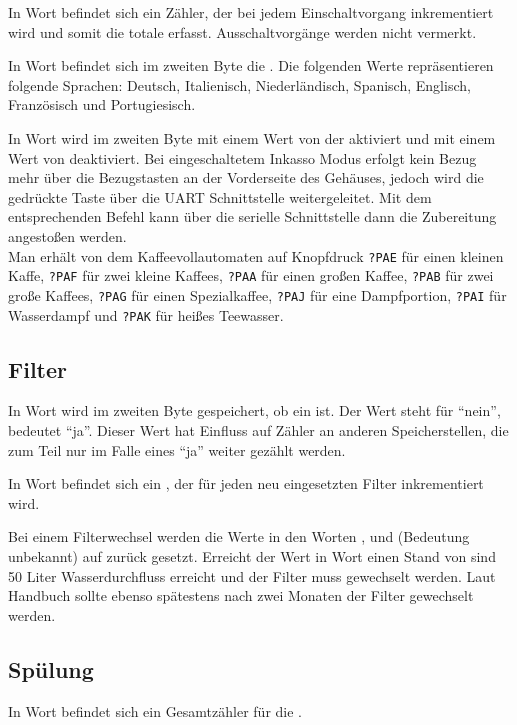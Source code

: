 In Wort  befindet sich ein Zähler, der bei jedem Einschaltvorgang inkrementiert wird und somit die totale  erfasst.
Ausschaltvorgänge werden nicht vermerkt.

In Wort  befindet sich im zweiten Byte die .
Die folgenden Werte repräsentieren folgende Sprachen:
 Deutsch,
 Italienisch,
 Niederländisch, 
 Spanisch,
 Englisch,
 Französisch und
 Portugiesisch.

In Wort  wird im zweiten Byte mit einem Wert von  der  aktiviert und mit einem Wert von  deaktiviert.
Bei eingeschaltetem Inkasso Modus erfolgt kein Bezug mehr über die Bezugstasten an der Vorderseite des Gehäuses, jedoch wird die gedrückte Taste über die \ac{UART} Schnittstelle weitergeleitet.
Mit dem entsprechenden Befehl kann über die serielle Schnittstelle dann die Zubereitung angestoßen werden.\\
Man erhält von dem Kaffeevollautomaten auf Knopfdruck
\texttt{?PAE} für einen kleinen Kaffe,
\texttt{?PAF} für zwei kleine Kaffees,
\texttt{?PAA} für einen großen Kaffee,
\texttt{?PAB} für zwei große Kaffees,
\texttt{?PAG} für einen Spezialkaffee,
\texttt{?PAJ} für eine Dampfportion,
\texttt{?PAI} für Wasserdampf und
\texttt{?PAK} für heißes Teewasser.

\subsection{Filter}
In Wort  wird im zweiten Byte gespeichert, ob ein  ist.
Der Wert  steht für "`nein"',  bedeutet "`ja"'.
Dieser Wert hat Einfluss auf Zähler an anderen Speicherstellen, die zum Teil nur im Falle eines "`ja"' weiter gezählt werden.

In Wort  befindet sich ein , der für jeden neu eingesetzten Filter inkrementiert wird.

Bei einem Filterwechsel werden die Werte in den Worten ,  und  (Bedeutung unbekannt) auf  zurück gesetzt.
Erreicht der Wert in Wort  einen Stand von  sind 50 Liter Wasserdurchfluss erreicht und der Filter muss gewechselt werden.
Laut Handbuch sollte ebenso spätestens nach zwei Monaten der Filter gewechselt werden.

\subsection{Spülung}
In Wort  befindet sich ein Gesamtzähler für die .

